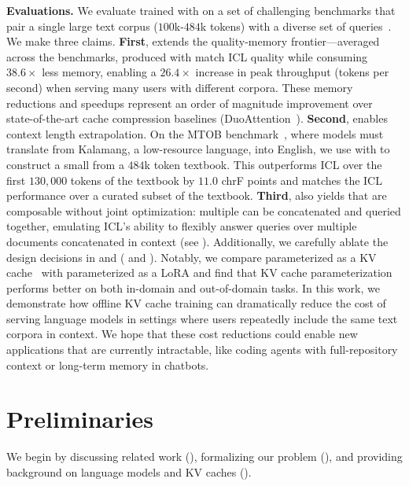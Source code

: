\textbf{Evaluations.} We evaluate \artifacts trained with {\method} on a set of challenging benchmarks that pair a single large text corpus ($100$k-$484$k tokens) with a diverse set of queries~\cite{islam2023financebench,adams2024longhealth,tanzer2023benchmark}.
We make three claims. \textbf{First}, \artifacts extends the quality-memory frontier---averaged across the benchmarks, \artifacts produced with \method match ICL quality while consuming $38.6\times$ less memory, enabling a $26.4\times$ increase in peak throughput (tokens per second) when serving many users with different corpora. These memory reductions and speedups represent an order of magnitude improvement over state-of-the-art cache compression baselines (\eg DuoAttention~\cite{xiao2024duoattention}). \textbf{Second}, \artifacts enables context length extrapolation. On the MTOB benchmark~\cite{tanzer2023benchmark}, where models must translate from Kalamang, a low-resource language, into English, we use \method with \llamaeightb to construct a small \artifact from a $484$k token textbook.
This \artifact outperforms ICL over the first $130,000$ tokens of the textbook by $11.0$ chrF points and matches the ICL performance over a curated subset of the textbook.
\textbf{Third}, \method also yields \artifacts that are composable without joint optimization: multiple \artifacts can be concatenated and queried together, emulating ICL's ability to flexibly answer queries over multiple documents concatenated in context (see ).
Additionally, we carefully ablate the design decisions in \method and \artifacts ( and ). Notably, we compare \artifacts parameterized as a KV cache~\cite{li2021prefix} with \artifacts parameterized as a LoRA \cite{hu2022lora} and find that KV cache parameterization performs better on both in-domain and out-of-domain tasks.
In this work, we demonstrate how offline KV cache training can dramatically reduce the cost of serving language models in settings where users repeatedly include the same text corpora in context.
We hope that these cost reductions could enable new applications that are currently intractable, like coding agents with full-repository context or long-term memory in chatbots.



\vspace{-2mm}
\section{Preliminaries}

We begin by discussing related work (), formalizing our problem (), and providing background on language models and KV caches ().
\label{sec:preliminaries}
